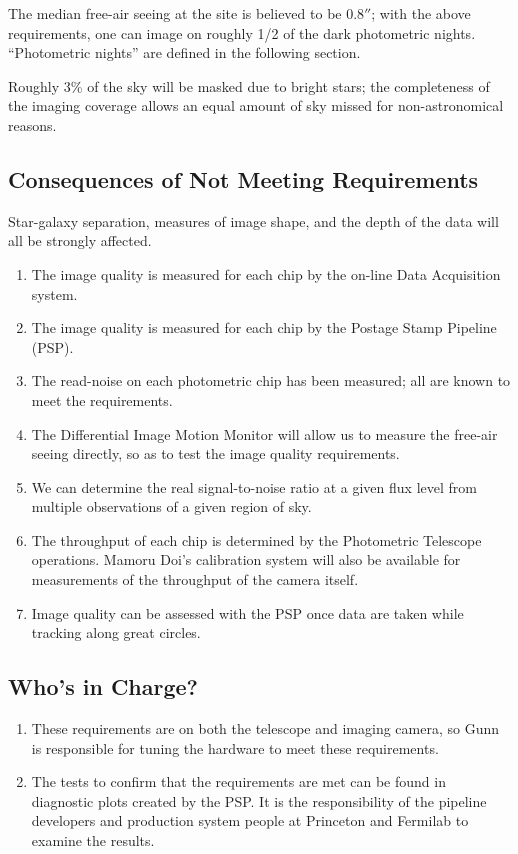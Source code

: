 The median free-air seeing at the site is believed to be $0.8''$; with
the above requirements, one can image on roughly 1/2 of the dark
photometric nights.  ``Photometric nights'' are defined in the
following section. 

Roughly 3\% of the sky will be masked due to bright stars; the
completeness of the imaging coverage allows an equal amount of sky
missed for non-astronomical reasons. 

\subsection{Consequences of Not Meeting Requirements}
Star-galaxy separation, measures of image shape, and the depth of
the data will all be strongly affected. 


\begin{enumerate} 
\item The image quality is measured for each chip by the on-line Data
Acquisition system. 

\item The image quality is measured for each chip by the Postage Stamp
Pipeline (PSP).  
\item The read-noise on each photometric chip has been measured; all
are known to meet the requirements.
\item The Differential Image Motion Monitor will allow us to measure
the free-air seeing directly, so as to test the image quality
requirements. 
\item We can determine the real signal-to-noise ratio at a given flux
level from multiple observations of a given region of sky. 
\item The throughput of each chip is determined by the Photometric
Telescope operations.  Mamoru Doi's calibration system will also be
available for measurements of the throughput of the camera itself.
\item  Image
quality can be assessed with the PSP once data are taken while
tracking along great circles. 
\end{enumerate}

\subsection{Who's in Charge?}
\begin{enumerate}
\item These requirements are on both the telescope
and imaging camera, so Gunn is responsible for tuning
the hardware to meet these requirements. 
\item The tests to confirm that the requirements are met can be found
in diagnostic plots created by the PSP.  It is the responsibility of the pipeline developers
and production system people at Princeton and Fermilab to examine the
results. 
\end{enumerate}
  
